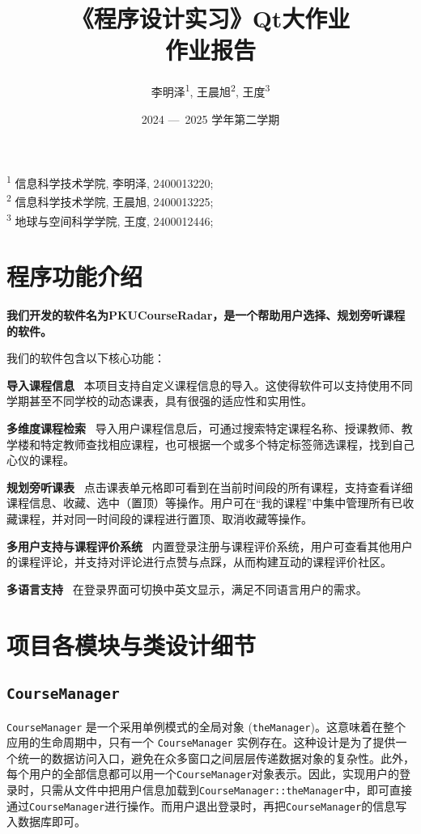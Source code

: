 \documentclass{article}
\title{\textbf{《程序设计实习》Qt大作业\\ 作业报告}}
\author{\kaishu 李明泽\textsuperscript{1}, 王晨旭\textsuperscript{2}, 王度\textsuperscript{3}}
\date{2024 —\ 2025 学年第二学期}
\begin{document}
\maketitle

\begin{center}  
\kaishu
\textsuperscript{1} 信息科学技术学院, 李明泽, 2400013220;\\
\textsuperscript{2} 信息科学技术学院, 王晨旭, 2400013225;\\
\textsuperscript{3} 地球与空间科学学院, 王度, 2400012446;\\
\end{center}

\tableofcontents

\section{程序功能介绍}

\textbf{我们开发的软件名为PKUCourseRadar，是一个帮助用户选择、规划旁听课程的软件。}

我们的软件包含以下核心功能：

\textbf{导入课程信息} \ 本项目支持自定义课程信息的导入。这使得软件可以支持使用不同学期甚至不同学校的动态课表，具有很强的适应性和实用性。

\textbf{多维度课程检索} \ 导入用户课程信息后，可通过搜索特定课程名称、授课教师、教学楼和特定教师查找相应课程，也可根据一个或多个特定标签筛选课程，找到自己心仪的课程。

\textbf{规划旁听课表} \ 点击课表单元格即可看到在当前时间段的所有课程，支持查看详细课程信息、收藏、选中（置顶）等操作。用户可在“我的课程”中集中管理所有已收藏课程，并对同一时间段的课程进行置顶、取消收藏等操作。

\textbf{多用户支持与课程评价系统} \ 内置登录注册与课程评价系统，用户可查看其他用户的课程评论，并支持对评论进行点赞与点踩，从而构建互动的课程评价社区。

\textbf{多语言支持} \ 在登录界面可切换中英文显示，满足不同语言用户的需求。

\section{项目各模块与类设计细节}

\subsection{\texttt{CourseManager}}
\texttt{CourseManager} 是一个采用单例模式的全局对象 (\texttt{theManager})。这意味着在整个应用的生命周期中，只有一个 \texttt{CourseManager} 实例存在。这种设计是为了提供一个统一的数据访问入口，避免在众多窗口之间层层传递数据对象的复杂性。此外，每个用户的全部信息都可以用一个\texttt{CourseManager}对象表示。因此，实现用户的登录时，只需从文件中把用户信息加载到\texttt{CourseManager::theManager}中，即可直接通过\texttt{CourseManager}进行操作。而用户退出登录时，再把\texttt{CourseManager}的信息写入数据库即可。
\end{document}
